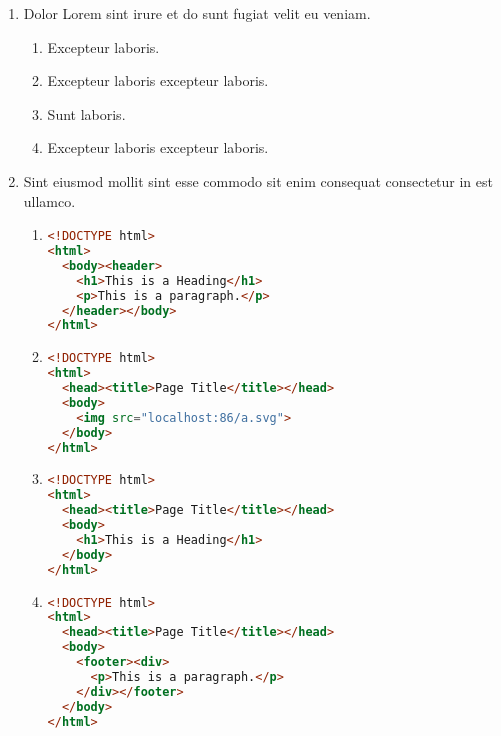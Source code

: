 \documentclass[a4paper,12pt]{article}
\begin{document}
\begin{enumerate}[label=\textbf{\arabic*.}]
\begin{multicols}{2}
\begin{enumerate}
	\end{enumerate}

\end{multicols}
\item Dolor Lorem sint irure et do sunt fugiat velit eu veniam.
\begin{multicols}{2}
	\begin{enumerate}
		\item  Excepteur laboris.
    
		\item  Excepteur laboris excepteur laboris.
  
		\item  Sunt laboris.
    
		\item  Excepteur laboris excepteur laboris.
    
	\end{enumerate}

\end{multicols}
\item Sint eiusmod mollit sint esse commodo sit enim consequat consectetur in est ullamco.
	\begin{enumerate}
		\item  \hfill \vspace*{-7mm}
    \begin{lstlisting}[language=HTML]
<!DOCTYPE html> 
<html>
  <body><header>
    <h1>This is a Heading</h1>
    <p>This is a paragraph.</p>
  </header></body>
</html>
    \end{lstlisting}
    
		\item  \hfill \vspace*{-7mm}
    \begin{lstlisting}[language=HTML]
<!DOCTYPE html>
<html>
  <head><title>Page Title</title></head>
  <body>
    <img src="localhost:86/a.svg">
  </body>
</html>
    \end{lstlisting}
    
		\item  \hfill \vspace*{-7mm}
    \begin{lstlisting}[language=HTML]
<!DOCTYPE html>
<html>
  <head><title>Page Title</title></head>
  <body>
    <h1>This is a Heading</h1>
  </body>
</html>
    \end{lstlisting}
    
		\item  \hfill \vspace*{-7mm}
    \begin{lstlisting}[language=HTML]
<!DOCTYPE html>
<html>
  <head><title>Page Title</title></head>
  <body>
    <footer><div>
      <p>This is a paragraph.</p>
    </div></footer>
  </body>
</html>
    \end{lstlisting}
  

\end{enumerate}
\end{enumerate}
\end{document}
